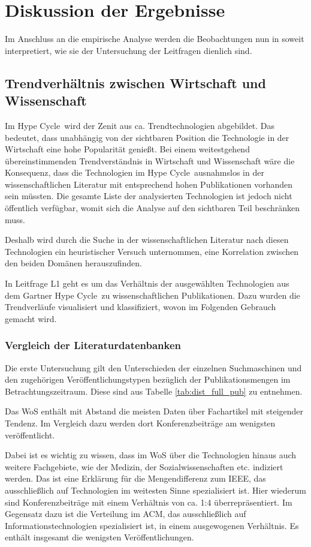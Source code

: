 \section{Diskussion der Ergebnisse}
Im Anschluss an die empirische Analyse werden die Beobachtungen nun in soweit interpretiert, wie sie der Untersuchung der Leitfragen dienlich sind.

\subsection{Trendverhältnis zwischen Wirtschaft und Wissenschaft}
Im \glqq Hype Cycle\grqq~wird der Zenit aus ca.  Trendtechnologien abgebildet. Das bedeutet, dass unabhängig von der sichtbaren Position die Technologie in der Wirtschaft eine hohe Popularität genießt. Bei einem weitestgehend übereinstimmenden Trendverständnis in Wirtschaft und Wissenschaft wäre die Konsequenz, dass die Technologien im \glqq Hype Cycle\grqq~ausnahmslos in der wissenschaftlichen Literatur mit entsprechend hohen Publikationen vorhanden sein müssten. Die gesamte Liste der analysierten Technologien ist jedoch nicht öffentlich verfügbar, womit sich die Analyse auf den sichtbaren Teil beschränken muss.

Deshalb wird durch die Suche in der wissenschaftlichen Literatur nach diesen Technologien ein heuristischer Versuch unternommen, eine Korrelation zwischen den beiden Domänen herauszufinden.

In Leitfrage L1 geht es um das Verhältnis der ausgewählten Technologien aus dem \glqq Gartner Hype Cycle\grqq~zu wissenschaftlichen Publikationen. Dazu wurden die Trendverläufe visualisiert und klassifiziert, wovon im Folgenden Gebrauch gemacht wird.

\subsubsection{Vergleich der Literaturdatenbanken}
Die erste Untersuchung gilt den Unterschieden der einzelnen Suchmaschinen und den zugehörigen Veröffentlichungstypen bezüglich der Publikationsmengen im Betrachtungszeitraum. Diese sind aus Tabelle \ref{tab:dist_full_pub} zu entnehmen.

Das \ac{WoS} enthält mit Abstand die meisten Daten über Fachartikel mit steigender Tendenz. Im Vergleich dazu werden dort Konferenzbeiträge am wenigsten veröffentlicht.

Dabei ist es wichtig zu wissen, dass im \ac{WoS} über die Technologien hinaus auch weitere Fachgebiete, wie der Medizin, der Sozialwissenschaften etc. indiziert werden. Das ist eine Erklärung für die Mengendifferenz zum \ac{IEEE}, das ausschließlich auf Technologien im weitesten Sinne spezialisiert ist. Hier wiederum sind Konferenzbeiträge mit einem Verhältnis von ca. 1:4 überrepräsentiert. Im Gegensatz dazu ist die Verteilung im \ac{ACM}, das ausschließlich auf Informationstechnologien spezialisiert ist, in einem ausgewogenen Verhältnis. Es enthält insgesamt die wenigsten Veröffentlichungen.



